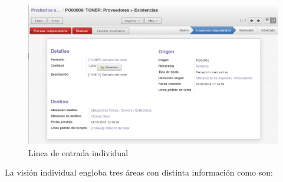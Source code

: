 \begin{figure}[H]
\includegraphics[width=\textwidth]{almacen/img/prod_entrada_i.png}
\caption{Linea de entrada individual}
\label{al:prodentradai}
\end{figure}

La visión individual engloba tres áreas con distinta información como son:


